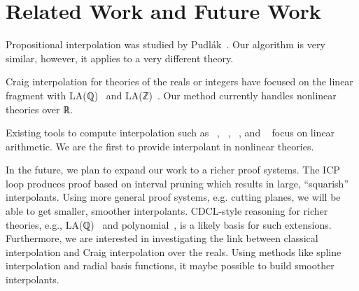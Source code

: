\section{Related Work and Future Work}
\label{sec:related}

Propositional interpolation was studied by Pudl{\'a}k~\cite{MR1472134}.
Our algorithm is very similar, however, it applies to a very different theory.

Craig interpolation for theories of the reals or integers have focused on the 
linear fragment with LA(ℚ)~\cite{DBLP:conf/tacas/McMillan04,DBLP:conf/vmcai/RybalchenkoS07} and LA(ℤ)~\cite{DBLP:conf/cade/BrilloutKRW10,DBLP:conf/tacas/GriggioLS11}.
Our method currently handles nonlinear theories over ℝ.

Existing tools to compute interpolation such as
\mathsat~\cite{mathsat5},
\princess~\cite{DBLP:conf/cade/BrilloutKRW10},
\smtinterpol~\cite{DBLP:conf/spin/ChristHN12}, and
\zthree~\cite{DBLP:conf/fmcad/McMillan11}
focus on linear arithmetic.
We are the first to provide interpolant in nonlinear theories.

In the future, we plan to expand our work to a richer proof systems.
The ICP loop produces proof based on interval pruning which results in large, ``squarish'' interpolants.
Using more general proof systems, e.g. cutting planes, we will be able to get smaller, smoother interpolants.
CDCL-style reasoning for richer theories, e.g., LA(ℚ)~\cite{DBLP:conf/cav/McMillanKS09} and polynomial~\cite{DBLP:conf/cade/JovanovicM12}, is a likely basis for such extensions.
Furthermore, we are interested in investigating the link between classical interpolation and Craig interpolation over the reals.
Using methods like spline interpolation and radial basis functions, it maybe possible to build smoother interpolants.
